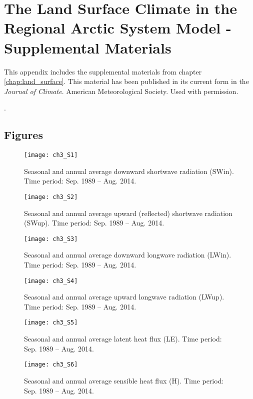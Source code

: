 \chapter{The Land Surface Climate in the Regional Arctic System Model - Supplemental Materials}
\label{chap:land_surface_sup}

This appendix includes the supplemental materials from chapter \ref{chap:land_surface}.
This material has been published in its current form in the \textit{Journal of Climate}.
\textcopyright American Meteorological Society.
Used with permission.

.

\section{Figures}

\begin{figure}
    \centering
    \texttt{[image: ch3\_S1]}
    \caption{Seasonal and annual average downward shortwave radiation (SWin).
    Time period: Sep. 1989 – Aug. 2014.}
\end{figure}

\begin{figure}
    \centering
    \texttt{[image: ch3\_S2]}
    \caption{Seasonal and annual average upward (reflected) shortwave radiation (SWup).
    Time period: Sep. 1989 – Aug. 2014.}
\end{figure}

\begin{figure}
    \centering
    \texttt{[image: ch3\_S3]}
    \caption{Seasonal and annual average downward longwave radiation (LWin).
    Time period: Sep. 1989 – Aug. 2014.}
\end{figure}

\begin{figure}
    \centering
    \texttt{[image: ch3\_S4]}
    \caption{Seasonal and annual average upward longwave radiation (LWup).
    Time period: Sep. 1989 – Aug. 2014.}
\end{figure}

\begin{figure}
    \centering
    \texttt{[image: ch3\_S5]}
    \caption{Seasonal and annual average latent heat flux (LE).
    Time period: Sep. 1989 – Aug. 2014.}
\end{figure}

\begin{figure}
    \centering
    \texttt{[image: ch3\_S6]}
    \caption{Seasonal and annual average sensible heat flux (H).
    Time period: Sep. 1989 – Aug. 2014.}
\end{figure}

